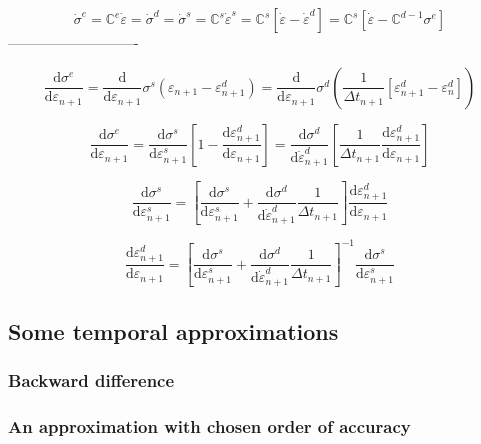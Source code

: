 \documentclass[12pt]{article}
\newcommand{\der}[2]{\dfrac{\text{d} #1}{\text{d} #2}}
\begin{document}
\begin{equation}
	\dot{\sigma}^{e} = \mathbb{C}^{e}\dot{\varepsilon} = \dot{\sigma}^{d} = \dot{\sigma}^{s} = \mathbb{C}^{s} \dot{\varepsilon}^{s} = \mathbb{C}^{s} \left[\dot{\varepsilon} - \dot{\varepsilon}^{d}\right] =  \mathbb{C}^{s} \left[\dot{\varepsilon} - \mathbb{C}^{d-1}\sigma^{e} \right]
\end{equation}
----------------------------

\begin{equation}
\der{\sigma^{e}}{\varepsilon_{n+1}} = \der{ }{\varepsilon_{n+1}}\sigma^{s}(\varepsilon_{n+1} - \varepsilon_{n+1}^{d})  = \der{ }{\varepsilon_{n+1}}\sigma^{d}\left( \dfrac{1}{\Delta t_{n+1}}\left[\varepsilon_{n+1}^{d} - \varepsilon_{n}^{d}\right]\right)
\end{equation}


\begin{equation}
\der{\sigma^{e}}{\varepsilon_{n+1}} = \der{\sigma^{s}}{\varepsilon^{s}_{n+1}}\left[1 - \der{\varepsilon_{n+1}^{d}}{\varepsilon_{n+1}} \right]    = \der{\sigma^{d}}{\dot{\varepsilon}^{d}_{n+1}}\left[ \dfrac{1}{\Delta t_{n+1}}\der{\varepsilon_{n+1}^{d}}{\varepsilon_{n+1}}\right]
\end{equation}

\begin{equation}
\der{\sigma^{s}}{\varepsilon^{s}_{n+1}}       = \left[\der{\sigma^{s}}{\varepsilon^{s}_{n+1}}    +\der{\sigma^{d}}{\dot{\varepsilon}^{d}_{n+1}}\dfrac{1}{\Delta t_{n+1}}\right]\der{\varepsilon_{n+1}^{d}}{\varepsilon_{n+1}}
\end{equation}


\begin{equation}
\der{\varepsilon_{n+1}^{d}}{\varepsilon_{n+1}} = \left[\der{\sigma^{s}}{\varepsilon^{s}_{n+1}}    +\der{\sigma^{d}}{\dot{\varepsilon}^{d}_{n+1}}\dfrac{1}{\Delta t_{n+1}}\right]^{-1}\der{\sigma^{s}}{\varepsilon^{s}_{n+1}} 
\end{equation}

\subsection{Some temporal approximations}

\subsubsection{Backward difference}

\subsubsection{An approximation with chosen order of accuracy}
\end{document}
